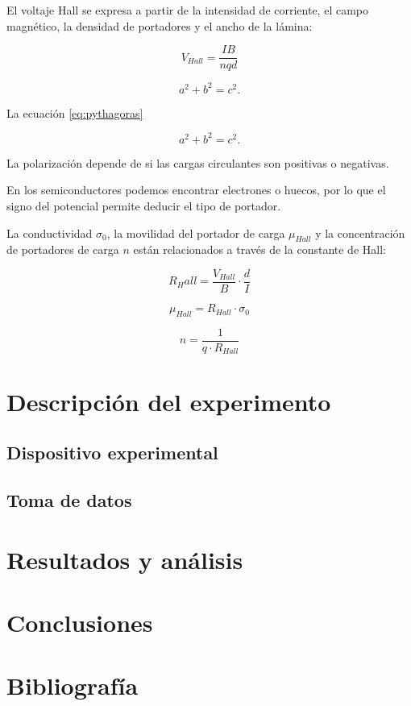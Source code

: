 \documentclass[a4paper,12pt,spanish]{report}
\begin{document}
	El voltaje Hall se expresa a partir de la intensidad de corriente, el campo magnético, la densidad de portadores y el ancho de la lámina:
	
	
	\[ V_{Hall} = \frac{I B}{nqd}
	\]
	
	\begin{equation}\label{eq:pythagoras}
	a^2 + b^2 = c^2 .
	\end{equation}
	
	La ecuación \eqref{eq:pythagoras}
	
	\begin{equation}
	a^2 + b^2 = c^2 .
	\end{equation}
	
	
	La polarización depende de si las cargas circulantes son positivas o negativas.
	
	En los semiconductores podemos encontrar electrones o huecos, por lo que el signo del potencial permite deducir el tipo de portador. 
	
	La conductividad $\sigma_0$, la movilidad del portador de carga $\mu_{Hall}$ y la concentración de portadores de carga $n$ están relacionados a través de la constante de Hall:
	
	\[ R_Hall = \frac{V_{Hall}}{B} \cdot \frac{d}{I}
	\]
	
	\[ \mu_{Hall} = R_{Hall}\cdot \sigma_0
	\]
	
	\[ n = \frac{1}{q\cdot R_{Hall}}
	\]
	
	
	
	\section{Descripción del experimento}
	
	\subsection{Dispositivo experimental}
	\subsection{Toma de datos}
	
	\section{Resultados y análisis}
	
	\section{Conclusiones}
	
	
	
	\section{Bibliografía}
	
	
	
\end{document}
